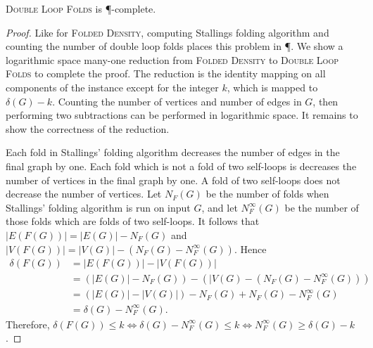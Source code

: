 \documentclass{article}
\newcommand{\FD}{\textsc{Folded Density}}
\newcommand{\DLF}{\textsc{Double Loop Folds}}
\begin{document}
\begin{theorem}
  \DLF{} is \P-complete.
\end{theorem}
\begin{proof}
  Like for \FD, computing Stallings folding algorithm and counting the number of double loop folds places this problem in \P.
  We show a logarithmic space many-one reduction from \FD{} to \DLF{} to complete the proof.
  The reduction is the identity mapping on all components of the instance except for the integer $k$, which is mapped to $\delta(G) - k$.
  Counting the number of vertices and number of edges in $G$, then performing two subtractions can be performed in logarithmic space.
  It remains to show the correctness of the reduction.

  Each fold in Stallings' folding algorithm decreases the number of edges in the final graph by one.
  Each fold which is not a fold of two self-loops is decreases the number of vertices in the final graph by one.
  A fold of two self-loops does not decrease the number of vertices.
  Let $N_F(G)$ be the number of folds when Stallings' folding algorithm is run on input $G$, and let $N^\infty_F(G)$ be the number of those folds which are folds of two self-loops.
  It follows that $|E(F(G))| = |E(G)| - N_F(G)$ and $|V(F(G))| = |V(G)| - (N_F(G) - N^\infty_F(G))$.
  Hence
  \begin{align*}
    \delta(F(G)) & = |E(F(G))| - |V(F(G))| \\
                 & = (|E(G)| - N_F(G)) - (|V(G) - (N_F(G) - N^\infty_F(G))) \\
                 & = (|E(G)| - |V(G)|) - N_F(G) + N_F(G) - N^\infty_F(G) \\
                 & = \delta(G) - N^\infty_F(G).
  \end{align*}
  Therefore, $\delta(F(G)) \leq k \iff \delta(G) - N^\infty_F(G) \leq k \iff N^\infty_F(G) \geq \delta(G) - k$.
\end{proof}



\end{document}
